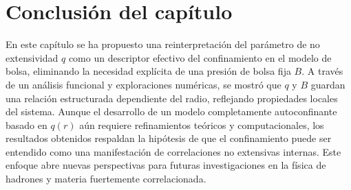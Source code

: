 \section*{Conclusi\'on del cap\'itulo}

En este cap\'itulo se ha propuesto una reinterpretaci\'on del par\'ametro de no extensividad \( q \) como un descriptor efectivo del confinamiento en el modelo de bolsa, eliminando la necesidad expl\'icita de una presi\'on de bolsa fija \( B \). A trav\'es de un an\'alisis funcional y exploraciones num\'ericas, se mostr\'o que \( q \) y \( B \) guardan una relaci\'on estructurada dependiente del radio, reflejando propiedades locales del sistema. Aunque el desarrollo de un modelo completamente autoconfinante basado en \( q(r) \) a\'un requiere refinamientos te\'oricos y computacionales, los resultados obtenidos respaldan la hip\'otesis de que el confinamiento puede ser entendido como una manifestaci\'on de correlaciones no extensivas internas. Este enfoque abre nuevas perspectivas para futuras investigaciones en la f\'isica de hadrones y materia fuertemente correlacionada.
\blankpage